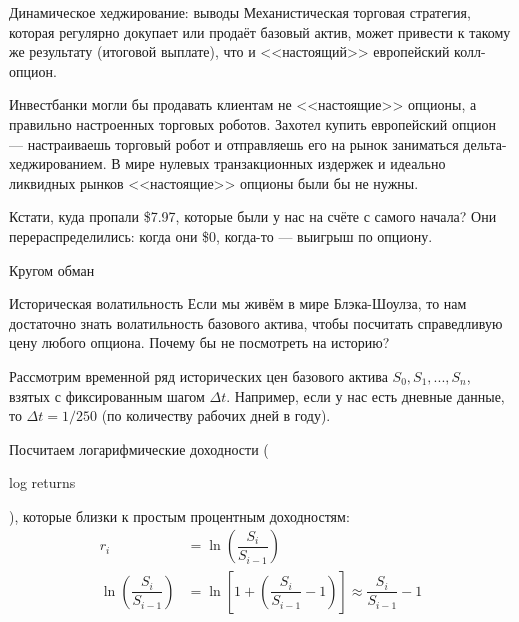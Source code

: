 \documentclass{beamer}
\newcommand{\en}[1]{\begin{otherlanguage}{english}#1\end{otherlanguage}}
\begin{document}
\begin{frame}{Динамическое хеджирование: выводы}
\justify
Механистическая торговая стратегия, которая регулярно докупает или продаёт базовый актив, может привести к такому же
результату (итоговой выплате), что и <<настоящий>> европейский колл-опцион.

\justify
Инвестбанки могли бы продавать клиентам не <<настоящие>> опционы, а правильно настроенных торговых роботов. Захотел
купить европейский опцион --- настраиваешь торговый робот и отправляешь его на рынок заниматься дельта-хеджированием.
В мире нулевых транзакционных издержек и идеально ликвидных рынков <<настоящие>> опционы были бы не нужны.

\justify
Кстати, куда пропали \$7.97, которые были у нас на счёте с самого начала? Они перераспределились: когда они \$0,
когда-то --- выигрыш по опциону.
\end{frame}



\begin{frame}{Кругом обман}
\centering
{}
\end{frame}



\begin{frame}{Историческая волатильность}
\justify
Если мы живём в мире Блэка-Шоулза, то нам достаточно знать волатильность базового актива, чтобы посчитать справедливую цену любого опциона. Почему бы не посмотреть на историю?

\justify
Рассмотрим временной ряд исторических цен базового актива $S_0,S_1,...,S_n$, взятых с фиксированным шагом $\Delta t$. Например, если у нас есть дневные данные, то $\Delta t = 1/250$ (по количеству рабочих дней в году). 

\justify
Посчитаем логарифмические доходности (\en{log returns}), которые близки к простым процентным доходностям:
\begin{align*}
r_i &= \ln \left( \dfrac{S_{i}}{S_{i-1}} \right) \\
\ln \left(\dfrac{S_{i}}{S_{i-1}} \right) &= \ln \left[1 + \left(\dfrac{S_{i}}{S_{i-1}} - 1 \right) \right] \approx \dfrac{S_{i}}{S_{i-1}} - 1
\end{align*}
\end{frame}
\end{document}
